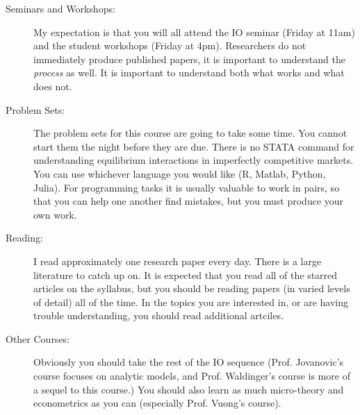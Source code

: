 \documentclass[11pt]{article}
\begin{document}
\begin{description}
\item[Seminars and Workshops:] My expectation is that you will all attend the IO seminar (Friday at 11am) and the student workshops (Friday at 4pm). Researchers do not immediately produce published papers, it is important to understand the \textit{process} as well. It is important to understand both what works and what does not.
\item[Problem Sets:] The problem sets for this course are going to take some time. You cannot start them the night before they are due. There is no STATA command for understanding equilibrium interactions in imperfectly competitive markets. You can use whichever language you would like (R, Matlab, Python, Julia). For programming tasks it is usually valuable to work in pairs, so that you can help one another find mistakes, but you must produce your own work. 
\item[Reading:] I read approximately one research paper every day. There is a large literature to catch up on. It is expected that you read all of the starred articles on the syllabus, but you should be reading papers (in varied levels of detail) all of the time. In the topics you are interested in, or are having trouble understanding, you should read additional artciles.
\item[Other Courses:] Obviously you should take the rest of the IO sequence (Prof. Jovanovic's course focuses on analytic models, and Prof. Waldinger's course is more of a sequel to this course.) You should also learn as much micro-theory and econometrics as you can (especially Prof. Vuong's course).
\end{description}
\end{document}
